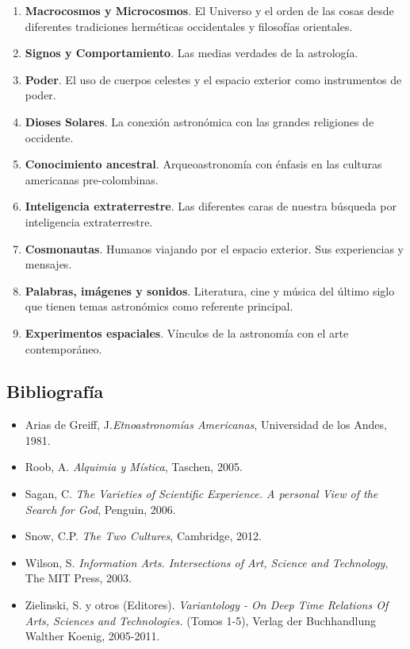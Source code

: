 \documentclass{report}
\begin{document}
\begin{enumerate}
\item {\bf Macrocosmos y Microcosmos}. El Universo y el orden de las
  cosas desde diferentes tradiciones herm\'eticas occidentales y
  filosof\'ias orientales.
\item {\bf Signos y Comportamiento}. Las medias verdades de la astrolog\'ia.
\item {\bf Poder}. El uso de cuerpos celestes y el espacio exterior como instrumentos de poder. 
\item {\bf Dioses Solares}. La conexi\'on astron\'omica con las grandes religiones de occidente. 
\item {\bf Conocimiento ancestral}. Arqueoastronom\'ia con \'enfasis en las culturas americanas pre-colombinas.
\item {\bf Inteligencia extraterrestre}. Las diferentes caras de
  nuestra b\'usqueda por inteligencia extraterrestre.
\item {\bf Cosmonautas}. Humanos viajando por el espacio exterior. Sus experiencias y mensajes.
\item {\bf Palabras, im\'agenes y sonidos}. Literatura, cine y
  m\'usica del \'ultimo siglo que tienen temas astron\'omics como
  referente principal.
\item {\bf Experimentos espaciales}. V\'inculos de la astronom\'ia con
  el arte contempor\'aneo.
\end{enumerate}

\subsection*{Bibliografía}

\begin{itemize}
\item Arias de Greiff, J.\emph{Etnoastronom\'ias Americanas}, Universidad de los Andes, 1981.
\item Roob, A. \emph{Alquimia y M\'istica}, Taschen, 2005.
\item Sagan, C. \emph{The Varieties of Scientific Experience. A personal View of the Search for God}, Penguin, 2006.
\item Snow, C.P. \emph{The Two Cultures}, Cambridge, 2012.
\item Wilson, S. \emph{Information Arts. Intersections of Art, Science
and Technology}, The MIT Press, 2003.
\item Zielinski, S. y otros (Editores). \emph{Variantology - On Deep Time
  Relations Of Arts, Sciences and Technologies.} (Tomos 1-5), Verlag
der Buchhandlung Walther Koenig, 2005-2011.
\end{itemize}
\end{document}
